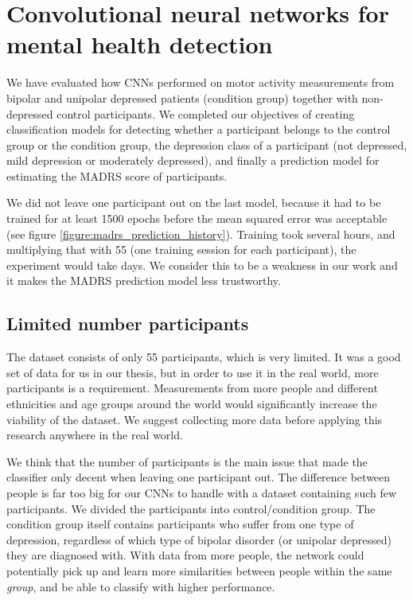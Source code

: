 \section{Convolutional neural networks for mental health detection}
We have evaluated how CNNs performed on motor activity measurements from bipolar and unipolar depressed patients (condition group) together with non-depressed control participants. We completed our objectives of creating classification models for detecting whether a participant belongs to the control group or the condition group, the depression class of a participant (not depressed, mild depression or moderately depressed), and finally a prediction model for estimating the MADRS score of participants. 

We did not leave one participant out on the last model, because it had to be trained for at least 1500 epochs before the mean squared error was acceptable (see figure \ref{figure:madrs_prediction_history}). Training took several hours, and multiplying that with 55 (one training session for each participant), the experiment would take days. We consider this to be a weakness in our work and it makes the MADRS prediction model less trustworthy. 

\subsection{Limited number participants}
The dataset consists of only 55 participants, which is very limited. It was a good set of data for us in our thesis, but in order to use it in the real world, more participants is a requirement. Measurements from more people and different ethnicities and age groups around the world would significantly increase the viability of the dataset. We suggest collecting more data before applying this research anywhere in the real world.
 
We think that the number of participants is the main issue that made the classifier only decent when leaving one participant out. The difference between people is far too big for our CNNs to handle with a dataset containing such few participants. We divided the participants into control/condition group. The condition group itself contains participants who suffer from one type of depression, regardless of which type of bipolar disorder (or unipolar depressed) they are diagnosed with. With data from more people, the network could potentially pick up and learn more similarities between people within the same \textit{group}, and be able to classify with higher performance. 

